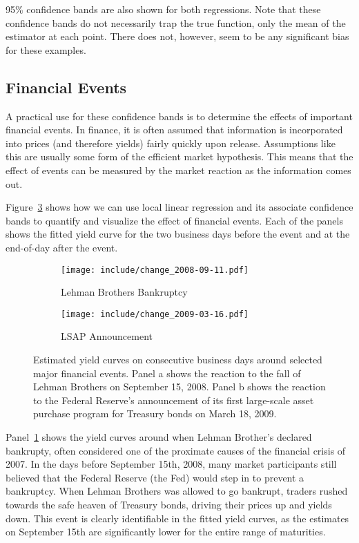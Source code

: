 \documentclass[12pt]{article}
\begin{document}
95\% confidence bands are also shown for both regressions. Note that these confidence bands do not necessarily trap the true function, only the mean of the estimator at each point. There does not, however, seem to be any significant bias for these examples.


\subsection{Financial Events}

A practical use for these confidence bands is to determine the effects of important financial events. In finance, it is often assumed that information is incorporated into prices (and therefore yields) fairly quickly upon release. Assumptions like this are usually some form of the efficient market hypothesis. This means that the effect of events can be measured by the market reaction as the information comes out.

Figure~\ref{fig:events} shows how we can use local linear regression and its associate confidence bands to quantify and visualize the effect of financial events. Each of the panels shows the fitted yield curve for the two business days before the event and at the end-of-day after the event.

\begin{figure}[htb] \centering
    \begin{subfigure}[t]{.49\linewidth}
        \texttt{[image: include/change\_2008-09-11.pdf]}
        \caption{Lehman Brothers Bankruptcy} \label{fig:events_lehman}
    \end{subfigure}
    \begin{subfigure}[t]{.49\linewidth}
        \texttt{[image: include/change\_2009-03-16.pdf]}
        \caption{LSAP Announcement} \label{fig:events_lsap}
    \end{subfigure}
    \caption{Estimated yield curves on consecutive business days around selected major financial events. Panel a shows the reaction to the fall of Lehman Brothers on September 15, 2008. Panel b shows the reaction to the Federal Reserve's announcement of its first large-scale asset purchase program for Treasury bonds on March 18, 2009. }
    \label{fig:events}
\end{figure}

Panel~\ref{fig:events_lehman} shows the yield curves around when Lehman Brother's declared bankrupty, often considered one of the proximate causes of the financial crisis of 2007. In the days before September 15th, 2008, many market participants still believed that the Federal Reserve (the Fed) would step in to prevent a bankruptcy. When Lehman Brothers was allowed to go bankrupt, traders rushed towards the safe heaven of Treasury bonds, driving their prices up and yields down. This event is clearly identifiable in the fitted yield curves, as the estimates on September 15th are significantly lower for the entire range of maturities.
\end{document}
